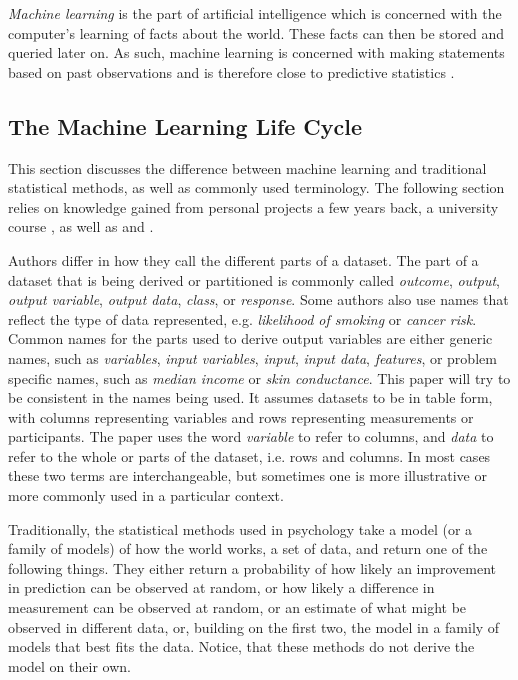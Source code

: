 \documentclass[a4paper,man,12pt,apacite,floatsintext]{apa6} %
\begin{document}
\emph{Machine learning} is the part of artificial intelligence which
is concerned with the computer's learning of facts about the world.
These facts can then be stored and queried later on.
As such, machine learning is concerned with making statements based
on past observations and is therefore close to predictive statistics
\cite{wpML}.

\subsection{The Machine Learning Life Cycle}
This section discusses the difference between machine learning and traditional
statistical methods, as well as commonly used terminology.
The following section relies on knowledge gained from personal projects a few
years back, a university course \cite{psymeth}, as well as 
and .

Authors differ in how they call the different parts of a dataset.
The part of a dataset that is being derived or partitioned is commonly called \emph{outcome},
\emph{output}, \emph{output variable}, \emph{output data}, \emph{class}, or \emph{response}.
Some authors also use names that reflect the type of data represented,
e.g. \emph{likelihood of smoking} or \emph{cancer risk}.
Common names for the parts used to derive output variables are either
generic names, such as \emph{variables}, \emph{input variables}, \emph{input}, \emph{input data}, \emph{features}, or
problem specific names, such as \emph{median income} or \emph{skin conductance}.
This paper will try to be consistent in the names being used.
It assumes datasets
to be in table form, with columns representing variables and rows representing
measurements or participants.
The paper uses the word \emph{variable} to refer to columns, and \emph{data}
to refer to the whole or parts of the dataset, i.e. rows and columns.
In most cases these two terms are interchangeable, but sometimes one is more
illustrative or more commonly used in a particular context.

Traditionally, the statistical methods used in psychology
take a model (or a family of models) of how the world works, a set of data, and return one of
the following things.
They either return a probability of how likely an improvement in prediction
can be observed at random, or how likely a difference in measurement can be
observed at random, or an estimate of what might be observed in different data,
or, building on the first two, the model in a family of models that best fits the data.
Notice, that these methods do not derive the model on their own.
\end{document}
